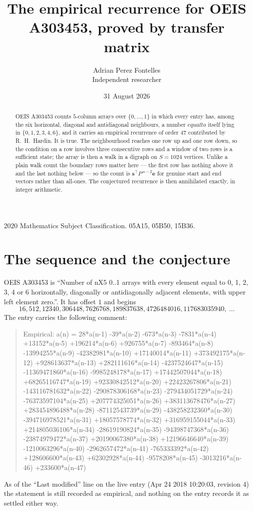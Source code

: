 \documentclass[11pt,a4paper]{article}
\title{The empirical recurrence for OEIS A303453, proved by transfer matrix}
\author{Adrian Perez Fontelles\\ \small Independent researcher}
\date{31 August 2026}
\theoremstyle{plain}
\theoremstyle{definition}
\begin{document}
\maketitle

\begin{abstract}
OEIS A303453 counts $5$-column arrays over $\{0,\dots,1\}$ in which every entry has,
among the six horizontal, diagonal and antidiagonal neighbours, a number $equal to$ itself lying in $\{0,1,2,3,4,6\}$, and it carries an empirical
recurrence of order $47$ contributed by R.~H.~Hardin. It is true. The neighbourhood
reaches one row up and one row down, so the condition on a row involves three consecutive
rows and a window of two rows is a sufficient state; the array is then a walk in a digraph
on $S=1024$ vertices. Unlike a plain walk count the boundary rows matter here --- the first
row has nothing above it and the last nothing below --- so the count is
$\mathbf{s}^{\!\top}P^{\,n-2}\mathbf{e}$ for genuine start and end vectors rather than
all-ones. The conjectured recurrence is then annihilated exactly, in integer arithmetic.
\end{abstract}

\noindent\small 2020 Mathematics Subject Classification. 05A15, 05B50, 15B36.\normalsize

\section{The sequence and the conjecture}

OEIS A303453 is ``Number of nX5 0..1 arrays with every element equal to 0, 1, 2, 3, 4 or 6 horizontally, diagonally or antidiagonally adjacent elements, with upper left element zero.''. It has offset
$1$ and begins
\[
16, 512, 12340, 306448, 7626768, 189837638, 4726484016, 117683035940,\ \dots
\]
The entry carries the following comment:
\begin{quote}\small
Empirical: a(n) = 28*a(n-1) -39*a(n-2) -673*a(n-3) -7831*a(n-4) +13152*a(n-5) +196214*a(n-6) +926755*a(n-7) -893464*a(n-8) -13994255*a(n-9) -42382981*a(n-10) +17140014*a(n-11) +373492175*a(n-12) +928613637*a(n-13) +282111616*a(n-14) -4237524647*a(n-15) -11369471860*a(n-16) -9985248178*a(n-17) +17442507044*a(n-18) +68265116747*a(n-19) +92330842512*a(n-20) +22423267806*a(n-21) -143116781632*a(n-22) -290878306168*a(n-23) -279434051729*a(n-24) -76373597104*a(n-25) +207774325051*a(n-26) +383113678476*a(n-27) +283454896488*a(n-28) -87112543739*a(n-29) -438258232360*a(n-30) -394716978521*a(n-31) +18057578774*a(n-32) +316959155044*a(n-33) +214805036106*a(n-34) -28619190824*a(n-35) -94398747368*a(n-36) -23874979472*a(n-37) +20190067380*a(n-38) +12196646640*a(n-39) -1210063296*a(n-40) -2962657472*a(n-41) -765333392*a(n-42) +128606600*a(n-43) +62302928*a(n-44) -9578208*a(n-45) -3013216*a(n-46) +233600*a(n-47)
\end{quote}
As of the ``Last modified'' line on the live entry (Apr 24 2018 10:20:03, revision
4) the statement is still recorded as empirical, and nothing on the entry
records it as settled either way.
\end{document}
